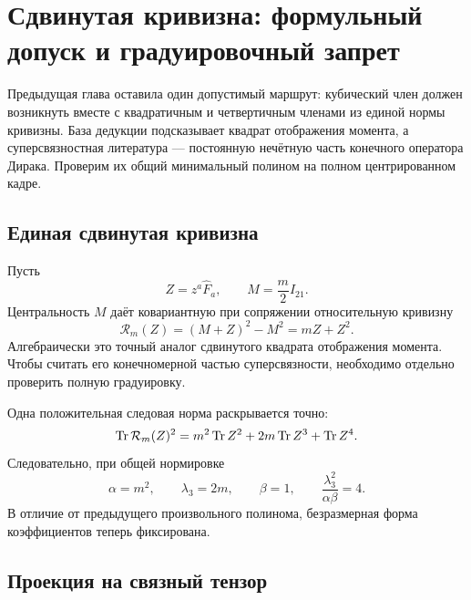 \chapter{Сдвинутая кривизна: формульный допуск и градуировочный запрет}
\label{ch:v8-baryon-spacetime-supercurvature-cubic-projection-admission-gate}

Предыдущая глава оставила один допустимый маршрут: кубический член должен
возникнуть вместе с квадратичным и четвертичным членами из единой нормы
кривизны. База дедукции подсказывает квадрат отображения момента, а
суперсвязностная литература --- постоянную нечётную часть конечного
оператора Дирака. Проверим их общий минимальный полином на полном
центрированном кадре.

\section{Единая сдвинутая кривизна}

Пусть
\begin{equation}
 Z=z^a\widehat F_a,\qquad
 M=\frac m2I_{21}.
 \label{eq:v8-baryon-shifted-supercurvature-field}
\end{equation}
Центральность $M$ даёт ковариантную при сопряжении относительную кривизну
\begin{equation}
 \mathcal R_m(Z)=(M+Z)^2-M^2=mZ+Z^2.
 \label{eq:v8-baryon-shifted-supercurvature}
\end{equation}
Алгебраически это точный аналог сдвинутого квадрата отображения момента.
Чтобы считать его конечномерной частью суперсвязности, необходимо отдельно
проверить полную градуировку.

Одна положительная следовая норма раскрывается точно:
\begin{equation}
 \operatorname{Tr}\mathcal R_m(Z)^2
 =m^2\operatorname{Tr} Z^2+2m\operatorname{Tr} Z^3+\operatorname{Tr} Z^4.
 \label{eq:v8-baryon-shifted-supercurvature-action}
\end{equation}
Следовательно, при общей нормировке
\begin{equation}
 \alpha=m^2,\qquad \lambda_3=2m,\qquad \beta=1,
 \qquad \frac{\lambda_3^2}{\alpha\beta}=4.
 \label{eq:v8-baryon-shifted-supercurvature-shape}
\end{equation}
В отличие от предыдущего произвольного полинома, безразмерная форма
коэффициентов теперь фиксирована.

\section{Проекция на связный тензор}

